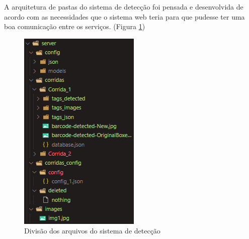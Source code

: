A arquitetura de pastas do sistema de detecção foi pensada e desenvolvida de acordo com as necessidades que o sistema web teria para que pudesse ter uma boa comunicação entre os serviços. (Figura \ref{fig:folderSystem})

\begin{figure}[H]
	\centering
	\includegraphics[width=0.4\linewidth]{figuras/MachineLearning/folderSystem.png}
	\caption{Divisão dos arquivos do sistema de detecção}
	\label{fig:folderSystem}
\end{figure}


